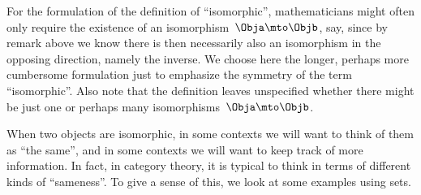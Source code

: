 {For the formulation of the definition of ``isomorphic'', mathematicians might often only require the existence of an isomorphism~$\Obja \mto \Objb$, say, since by remark above we know there is then necessarily also an isomorphism in the opposing direction, namely the inverse.
We choose here the longer, perhaps more cumbersome formulation just to emphasize the symmetry of the term ``isomorphic''.
Also note that the definition leaves unspecified whether there might be just one or perhaps many isomorphisms~$\Obja \mto \Objb$.

When two objects are isomorphic, in some contexts we will want to think of them as ``the same'', and in some contexts we will want to keep track of more information.
In fact, in category theory, it is typical to think in terms of different kinds of ``sameness''.
To give a sense of this, we look at some examples using sets.

}
